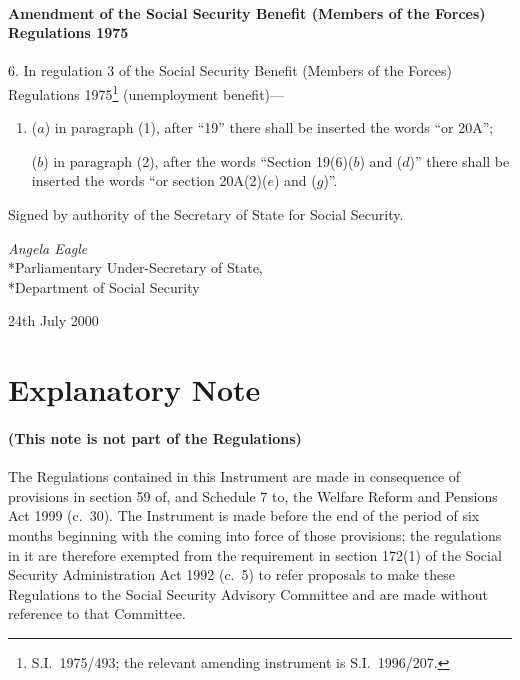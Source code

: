 \documentclass[12pt,a4paper]{article}
\begin{document}
\subsection[6. Amendment of the Social Security Benefit (Members of the Forces) Regulations 1975]{Amendment of the Social Security Benefit (Members of the Forces) Regulations 1975}

6.  In regulation 3 of the Social Security Benefit (Members of the Forces) Regulations 1975\footnote{S.I.\ 1975/493; the relevant amending instrument is S.I.\ 1996/207.} (unemployment benefit)—
\begin{enumerate}\item[]
($a$) in paragraph (1), after “19” there shall be inserted the words “or 20A”;

($b$) in paragraph (2), after the words “Section 19(6)($b$)  and ($d$)” there shall be inserted the words “or section 20A(2)($e$)  and ($g$)”.
\end{enumerate}

\bigskip

Signed 
by authority of the Secretary of State for Social Security.

{\raggedleft
\emph{Angela Eagle}\\*Parliamentary Under-Secretary of State,\\*Department of Social Security

}

24th July 2000

\small

\part{Explanatory Note}

\renewcommand\parthead{— Explanatory Note}

\subsection*{(This note is not part of the Regulations)}

The Regulations contained in this Instrument are made in consequence of provisions in section 59 of, and Schedule 7 to, the Welfare Reform and Pensions Act 1999 (c.\ 30). The Instrument is made before the end of the period of six months beginning with the coming into force of those provisions; the regulations in it are therefore exempted from the requirement in section 172(1) of the Social Security Administration Act 1992 (c.\ 5) to refer proposals to make these Regulations to the Social Security Advisory Committee and are made without reference to that Committee.
\end{document}
